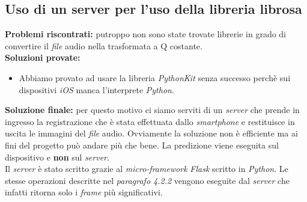 \subsection{Uso di un server per l'uso della libreria librosa}
\textbf{Problemi riscontrati:} putroppo non sono state trovate librerie in grado di convertire il \textit{file} audio nella trasformata a Q costante.\\
\newline
%
\textbf{Soluzioni provate:}
\begin{itemize}
	\item Abbiamo provato ad usare la libreria \textit{PythonKit} senza successo perchè sui dispositivi \textit{iOS} manca l'interprete \textit{Python}.\\
\end{itemize}
%
\textbf{Soluzione finale:} per questo motivo ci siamo serviti di un \textit{server} che prende in ingresso la registrazione che è stata effettuata dallo \textit{smartphone} e restituisce in uscita le immagini del \textit{file} audio. Ovviamente la soluzione non è efficiente ma ai fini del progetto può andare più che bene. La predizione viene eseguita sul dispositivo e \textbf{non} sul \textit{server}.\\
\newline
Il \textit{server} è stato scritto grazie al \textit{micro-framework} \textit{Flask} scritto in \textit{Python}.
\vspace*{2ex}
\vspace*{2ex}
Le stesse operazioni descritte nel \textit{paragrafo 4.2.2} vengono eseguite dal \textit{server} che infatti ritorna solo i \textit{frame} più significativi.
